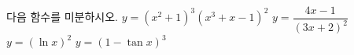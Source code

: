 다음 함수를 미분하시오.
 $y=(x^2+1)^3(x^3+x-1)^2$
 $y=\dfrac{4x-1}{(3x+2)^2}$
 $y=(\ln x)^2$
 $y=(1-\tan x)^3$
